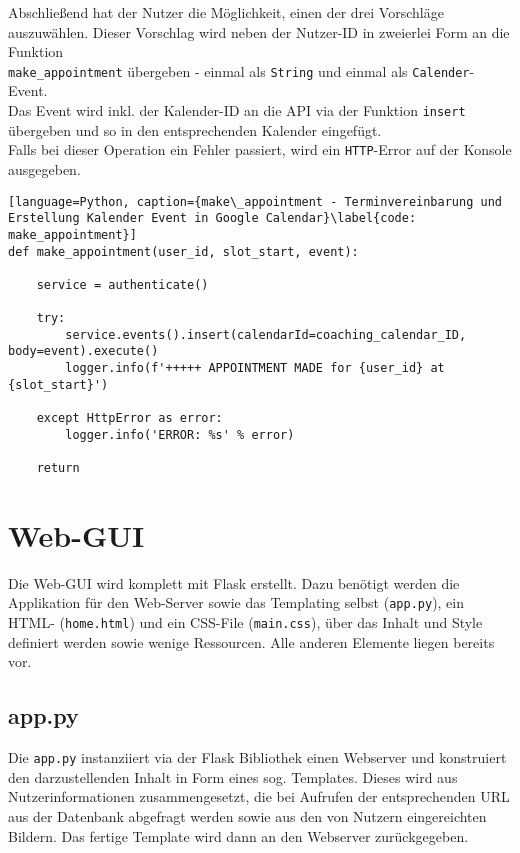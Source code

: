                 Abschließend hat der Nutzer die Möglichkeit, einen der drei Vorschläge auszuwählen. Dieser Vorschlag wird neben der Nutzer-ID in zweierlei Form an die Funktion \\\verb|make_appointment| übergeben - einmal als \verb|String| und einmal als \verb|Calender|-Event. \\
                Das Event wird inkl. der Kalender-ID an die API via der Funktion \verb|insert| übergeben und so in den entsprechenden Kalender eingefügt. \\
                Falls bei dieser Operation ein Fehler passiert, wird ein \verb|HTTP|-Error auf der Konsole ausgegeben.

                \begin{lstlisting}[language=Python, caption={make\_appointment - Terminvereinbarung und Erstellung Kalender Event in Google Calendar}\label{code: make_appointment}]
def make_appointment(user_id, slot_start, event):

    service = authenticate()

    try:
        service.events().insert(calendarId=coaching_calendar_ID, body=event).execute()
        logger.info(f'+++++ APPOINTMENT MADE for {user_id} at {slot_start}')

    except HttpError as error:
        logger.info('ERROR: %s' % error)

    return
                \end{lstlisting}

    
    \section{Web-GUI}
        Die Web-GUI wird komplett mit Flask erstellt. Dazu benötigt werden die Applikation für den Web-Server sowie das Templating selbst (\verb|app.py|), ein HTML- (\verb|home.html|) und ein CSS-File (\verb|main.css|), über das Inhalt und Style definiert werden sowie wenige Ressourcen. Alle anderen Elemente liegen bereits vor.
        
        \subsection{app.py} \label{Implementierung: app.py}
            Die \verb|app.py| instanziiert via der Flask Bibliothek einen Webserver und konstruiert den darzustellenden Inhalt in Form eines sog. Templates. Dieses wird aus Nutzerinformationen zusammengesetzt, die bei Aufrufen der entsprechenden URL aus der Datenbank abgefragt werden sowie aus den von Nutzern eingereichten Bildern. 
            Das fertige Template wird dann an den Webserver zurückgegeben.

